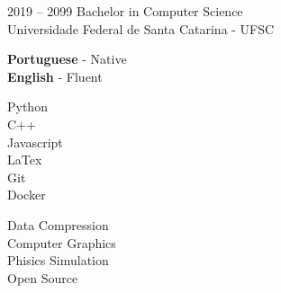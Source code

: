 \documentclass[11pt]{developercv} %
\begin{document}


\begin{entrylist}
	\entry
		{2019 -- 2099}
		{Bachelor in Computer Science}
		{\\Universidade Federal de Santa Catarina - UFSC}
		{}
\end{entrylist}


\begin{minipage}[t]{0.3\textwidth}
	\vspace{-\baselineskip} %
 
	\textbf{Portuguese} - Native \\
	\textbf{English} - Fluent
\end{minipage}
\hfill
\begin{minipage}[t]{0.3\textwidth}
	\vspace{-\baselineskip} %
 
    Python\\
    C++\\
    Javascript\\
    LaTex\\
    Git\\
    Docker\\
    
    
\end{minipage}
\hfill
\begin{minipage}[t]{0.3\textwidth}
	\vspace{-\baselineskip} %
 
    Data Compression\\
    Computer Graphics\\
    Phisics Simulation\\
    Open Source
\end{minipage}

\end{document}
